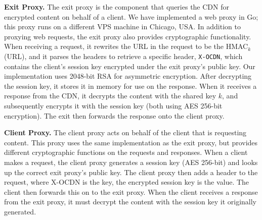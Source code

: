 \textbf{Exit Proxy.} The exit proxy is the component that queries the CDN for
encrypted
content on behalf of a client.  We have implemented a web proxy in Go; this proxy
runs on
a different VPS machine in Chicago, USA.  In addition to proxying web requests, the exit 
proxy also provides cryptographic functionality.  When receiving a request, it rewrites
the URL in the request to be the HMAC$_{k}$(URL), and it parses the headers to retrieve a 
specific header, {\tt X-OCDN}, which contains the client's session key encrypted
under the exit
proxy's public key.  Our implementation uses 2048-bit RSA for asymmetric encryption.  After 
decrypting the session key, it stores it in memory for use on the response.  When 
it receives a response from the CDN, it decrypts the content with the shared key $k$, and 
subsequently encrypts it with the session key (both using AES 256-bit encryption).  The 
exit then forwards the response onto the client proxy.

\textbf{Client Proxy.} The client proxy acts on behalf of the client that is
requesting
content.  This proxy uses the same implementation as the exit proxy, but provides 
different cryptographic functions on the requests and responses.  When a client makes 
a request, the client proxy generates a session key  (AES 256-bit) and looks up the correct exit proxy's 
public key.  The client proxy then adds a header to the request, 
where X-OCDN is the key, the encrypted session key is the value.  The client then forwards this on to the 
exit proxy.  When the client receives a response from the exit proxy, it must decrypt the content 
with the session key it originally generated.   
